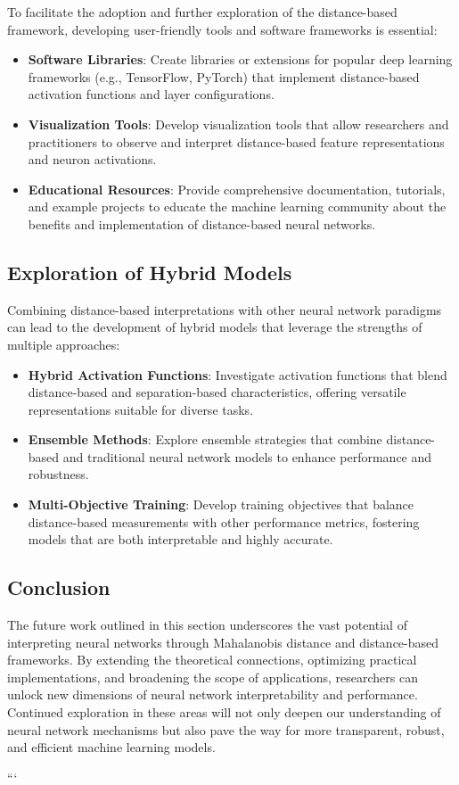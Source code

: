 To facilitate the adoption and further exploration of the distance-based framework, developing user-friendly tools and software frameworks is essential:
\begin{itemize}
    \item \textbf{Software Libraries}: Create libraries or extensions for popular deep learning frameworks (e.g., TensorFlow, PyTorch) that implement distance-based activation functions and layer configurations.
    \item \textbf{Visualization Tools}: Develop visualization tools that allow researchers and practitioners to observe and interpret distance-based feature representations and neuron activations.
    \item \textbf{Educational Resources}: Provide comprehensive documentation, tutorials, and example projects to educate the machine learning community about the benefits and implementation of distance-based neural networks.
\end{itemize}

\subsection{Exploration of Hybrid Models}

Combining distance-based interpretations with other neural network paradigms can lead to the development of hybrid models that leverage the strengths of multiple approaches:
\begin{itemize}
    \item \textbf{Hybrid Activation Functions}: Investigate activation functions that blend distance-based and separation-based characteristics, offering versatile representations suitable for diverse tasks.
    \item \textbf{Ensemble Methods}: Explore ensemble strategies that combine distance-based and traditional neural network models to enhance performance and robustness.
    \item \textbf{Multi-Objective Training}: Develop training objectives that balance distance-based measurements with other performance metrics, fostering models that are both interpretable and highly accurate.
\end{itemize}

\subsection{Conclusion}

The future work outlined in this section underscores the vast potential of interpreting neural networks through Mahalanobis distance and distance-based frameworks. By extending the theoretical connections, optimizing practical implementations, and broadening the scope of applications, researchers can unlock new dimensions of neural network interpretability and performance. Continued exploration in these areas will not only deepen our understanding of neural network mechanisms but also pave the way for more transparent, robust, and efficient machine learning models.

```